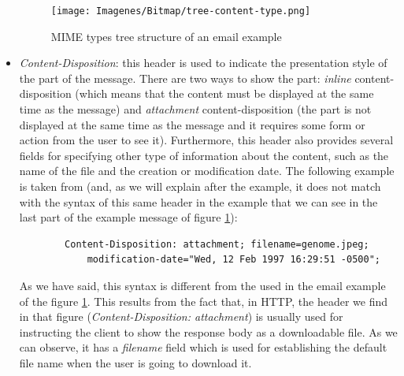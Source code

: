 \begin{itemize}
	\begin{figure}[t]
		\centering%
		\texttt{[image: Imagenes/Bitmap/tree-content-type.png]}%
		\caption{MIME types tree structure of an email example}%
		\label{fig:content-type}
	\end{figure}
	\item\textit{Content-Disposition}: this header is used to indicate the presentation style of the part of the message. There are two ways to show the part: \textit{inline} content-disposition (which means that the content must be displayed at the same time as the message) and \textit{attachment} content-disposition (the part is not displayed at the same time as the message and it requires some form or action from the user to see it). Furthermore, this header also provides several fields for specifying other type of information about the content, such as the name of the file and the creation or modification date. The following example is taken from \cite{rfc2183} (and, as we will explain after the example, it does not match with the syntax of this same header in the example that we can see in the last part of the example message of figure \ref{fig:content-type}):
	\begin{lstlisting}
		Content-Disposition: attachment; filename=genome.jpeg;
			modification-date="Wed, 12 Feb 1997 16:29:51 -0500";
	\end{lstlisting}
	As we have said, this syntax is different from the used in the email example of the figure \ref{fig:content-type}. This results from the fact that, in HTTP, the header we find in that figure (\textit{Content-Disposition: attachment}) is usually used for instructing the client to show the response body as a downloadable file. As we can observe, it has a \textit{filename} field which is used for establishing the default file name when the user is going to download it.
	

\end{itemize}
